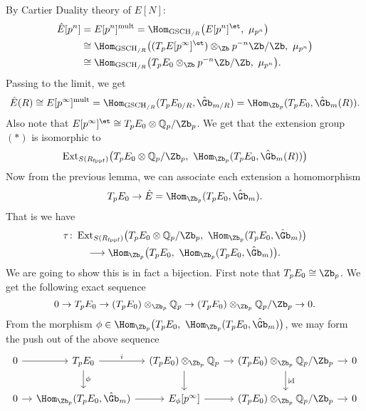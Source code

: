 \documentclass[twoside]{article}
\begin{document}
    By Cartier Duality theory of $E[N]$:
    \[ \begin{aligned}
        \hat{E}[p^{n}]
        &=E[p^{n}]^{\mathrm{mult}}=\Hom_{\mathrm{GSCH}_{/R}}\bigl(E[p^{n}]^{\et},\ \mu_{p^{n}}\bigr) \\ 
        &\cong \Hom_{\mathrm{GSCH}_{/R}}\bigl((T_{p}E[p^{\infty}]^{\et})\otimes_{\Zb}p^{-n}\Zb/\Zb,\ \mu_{p^{n}}\bigr) \\
        &\cong \Hom_{\mathrm{GSCH}_{/R}}\bigl(T_{p}E_{0}\otimes_{\Zb}p^{-n}\Zb/\Zb,\ \mu_{p^{n}}\bigr). 
    \end{aligned}      \]
    Passing to the limit, we get 
    \[ \hat{E}(R)\cong E[p^{\infty}]^{\mathrm{mult}}=
    \Hom_{\mathrm{GSCH}_{/R}}(T_{p}E_{0/R},\hat{\Gb}_{m/R})=\Hom_{\Zb_{p}}(T_{p}E_{0},\hat{\Gb}_{m}(R)) .  \]
    Also note that $E[p^{\infty}]^{\et}\cong T_{p}E_{0}\otimes \mathbb{Q}_{p}/\Zb_{p}$.
    We get that the extension group $(*)$ is isomorphic to 
    \[    \operatorname{Ext}_{S(R_{\mathrm{fppf}})}\bigl(
        T_{p}E_{0}\otimes \mathbb{Q}_{p}/\Zb_{p},\ \Hom_{\Zb_{p}}(T_{p}E_{0},\hat{\Gb}_{m}(R))\bigr) \]
    Now from the previous lemma, we can associate each extension a homomorphism 
    \[   T_{p}E_{0}\to \hat{E}=\Hom_{\Zb_{p}}(T_{p}E_{0},\hat{\Gb}_{m} ) . \]
    That is we have 
    \begin{multline*}
        \tau\colon  \operatorname{Ext}_{S(R_{\mathrm{fppf}})}\bigl(
            T_{p}E_{0}\otimes \mathbb{Q}_{p}/\Zb_{p},\ 
            \Hom_{\Zb_{p}}(T_{p}E_{0},\hat{\Gb}_{m})\bigr) \\
            \longrightarrow \Hom_{\Zb_{p}}\bigl(T_{p}E_{0},\ 
            \Hom_{\Zb_{p}}(T_{p}E_{0},\hat{\Gb}_{m})\bigr).
    \end{multline*}
    We are going to show this is in fact a bijection.
    First note that $T_{p}E_{0}\cong \Zb_{p}$. We get the following exact sequence 
    \[ 0\to T_{p}E_{0} \to (T_{p}E_{0})\otimes_{\Zb_{p}} \mathbb{Q}_{p} 
        \to (T_{p}E_{0})\otimes_{\Zb_{p}} \mathbb{Q}_{p}/\Zb_{p} \to 0 . \]
    From the morphism 
    $\phi \in \Hom_{\Zb_{p}}\bigl(T_{p}E_{0},\ \Hom_{\Zb_{p}}(T_{p}E_{0},\hat{\Gb}_{m})\bigr)$,
    we may form the push out of the above sequence 
    \[ \begin{tikzcd}[column sep=1em]
        0\ar[r]&T_{p}E_{0} \ar[r, "i"]\ar[d, "\phi"] &
        (T_{p}E_{0})\otimes_{\Zb_{p}} \mathbb{Q}_{p} \ar[r]\ar[d] & 
        (T_{p}E_{0})\otimes_{\Zb_{p}} \mathbb{Q}_{p}/\Zb_{p} \ar[r] \ar[d, "\mathrm{id}"]& 0 \\
        0 \ar[r]& \Hom_{\Zb_{p}}(T_{p}E_{0},\hat{\Gb}_{m}) \ar[r]& 
        E_{\phi}[p^{\infty}] \ar[r] & 
        (T_{p}E_{0})\otimes_{\Zb_{p}} \mathbb{Q}_{p}/\Zb_{p} \ar[r] & 0
    \end{tikzcd} \]
\end{document}
